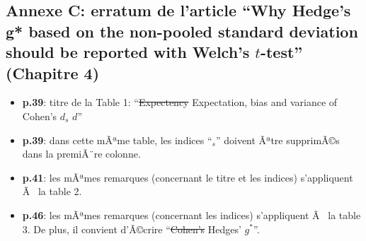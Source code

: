 \begin{appendix}
\hypertarget{annexe-c-erratum-de-larticle-why-hedges-g-based-on-the-non-pooled-standard-deviation-should-be-reported-with-welchs-t-test-chapitre-4}{%
\subsection{\texorpdfstring{Annexe C: erratum de l'article ``Why Hedge's
g* based on the non-pooled standard deviation should be reported with
Welch's \(t\)-test'' (Chapitre
4)}{Annexe C: erratum de l'article ``Why Hedge's g* based on the non-pooled standard deviation should be reported with Welch's t-test'' (Chapitre 4)}}\label{annexe-c-erratum-de-larticle-why-hedges-g-based-on-the-non-pooled-standard-deviation-should-be-reported-with-welchs-t-test-chapitre-4}}

\begin{itemize}
\tightlist
\item
  \textbf{p.39}: titre de la Table 1: ``\sout{Expectency}
  \color{blue}Expectation\color{black}, bias and variance of Cohen's
  \sout{\(d_s\)} \(d\)''
\item
  \textbf{p.39}: dans cette mÃªme table, les indices ``\(_s\)'' doivent
  Ãªtre supprimÃ©s dans la premiÃ¨re colonne.
\item
  \textbf{p.41}: les mÃªmes remarques (concernant le titre et les
  indices) s'appliquent Ã~ la table 2.
\item
  \textbf{p.46}: les mÃªmes remarques (concernant les indices)
  s'appliquent Ã~ la table 3. De plus, il convient d'Ã©crire
  ``\sout{Cohen's} \color{blue}Hedges' \(g^*\)\color{black}''.
\end{itemize}
\end{appendix}
